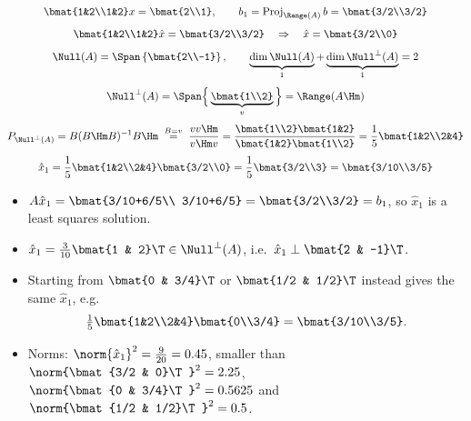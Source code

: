 \begin{example}
\begin{gather*}
\bmat{1&2\\1&2}x = \bmat{2\\1}, \qquad
b_1 = \operatorname{Proj}_{\Range(A)} b = \bmat{3/2\\3/2}\\[4pt]
\bmat{1&2\\1&2}\hat x = \bmat{3/2\\3/2}
\quad\Rightarrow\quad
\hat x = \bmat{3/2\\0}\\[4pt]
\Null(A) = \Span\left\{\bmat{2\\-1}\right\}, \qquad
\underbrace{\dim\Null(A)}_{1} + \underbrace{\dim\Null^\perp(A)}_{1} = 2\\[4pt]
\Null^\perp(A) = \Span\Big\{\underbrace{\bmat{1\\2}}_{v}\Big\} = \Range(A\Hm)\\[4pt]
P_{\Null^\perp(A)} = B(B\Hm B)^{-1}B\Hm \;\overset{B=v}{=}\; \frac{vv\Hm}{v\Hm v}
= \frac{\bmat{1\\2}\bmat{1&2}}{\bmat{1&2}\bmat{1\\2}} = \frac15\bmat{1&2\\2&4}\\[4pt]
\hat x_1 = \frac15\bmat{1&2\\2&4}\bmat{3/2\\0} = \frac15\bmat{3/2\\3} = \bmat{3/10\\3/5}
\end{gather*}
\begin{insight}
\begin{itemize}[nosep]
  \item $A\hat x_1 = \bmat{3/10+6/5\\ 3/10+6/5} = \bmat{3/2\\3/2} = b_1$, so $\hat x_1$ is a least squares solution.
  \item $\hat x_1 = \tfrac{3}{10}\bmat{1 & 2}\T\in\Null^\perp(A)$, i.e.\ $\hat x_1\perp\bmat{2 & -1}\T$.
  \item Starting from $\bmat{0 & 3/4}\T$ or $\bmat{1/2 & 1/2}\T$ instead gives the same $\hat x_1$, e.g.
        \[
        \tfrac15\bmat{1&2\\2&4}\bmat{0\\3/4} = \bmat{3/10\\3/5}.
        \]
  \item Norms: $\norm{\hat x_1}^2 = \tfrac{9}{20} = 0.45$, smaller than
        $\norm{\bmat{3/2 & 0}\T}^2 = 2.25$, $\norm{\bmat{0 & 3/4}\T}^2 = 0.5625$ and $\norm{\bmat{1/2 & 1/2}\T}^2 = 0.5$.
\end{itemize}
\end{insight}
\end{example}
